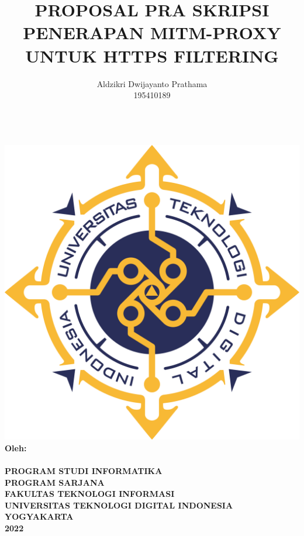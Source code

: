 \documentclass[a4paper,12pt]{article}
\begin{document}
\title{{\large PROPOSAL PRA SKRIPSI\\
  \Large{PENERAPAN MITM-PROXY UNTUK HTTPS FILTERING}}}
\author{Aldzikri Dwijayanto Prathama
    \\195410189}
\makeatletter
\begin{titlepage}
    \begin{center}
        {\huge \bfseries \@title}\\[14ex]
        \includegraphics[scale=.41]{logo}\\[4ex]
        {\large \bfseries Oleh:\\ \@author}\\[12ex]
        {\large \bfseries {PROGRAM STUDI INFORMATIKA\\
        PROGRAM SARJANA\\
        FAKULTAS TEKNOLOGI INFORMASI\\
        UNIVERSITAS TEKNOLOGI DIGITAL INDONESIA\\
        YOGYAKARTA\\
        2022}}
    \end{center}

\end{titlepage}
\makeatother

\newpage
\tableofcontents
\newpage
\end{document}
